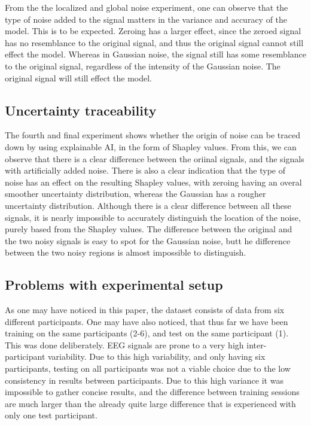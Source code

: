 From the the localized and global noise experiment, one can observe that the type of noise added to the signal matters in the variance and accuracy of the model. This is to be expected. Zeroing has a larger effect, since the zeroed signal has no resemblance to the original signal, and thus the original signal cannot still effect the model. Whereas in Gaussian noise, the signal still has some resemblance to the original signal, regardless of the intensity of the Gaussian noise. The original signal will still effect the model.  

\subsection{Uncertainty traceability}


The fourth and final experiment shows whether the origin of noise can be traced down by using explainable AI, in the form of Shapley values. From this, we can observe that there is a clear difference between the oriinal signals, and the signals with artificially added noise. There is also a clear indication that the type of noise has an effect on the resulting Shapley values, with zeroing having an overal smoother uncertainty distribution, whereas the Gaussian has a rougher uncertainty distribution. Although there is a clear difference between all these signals, it is nearly impossible to accurately distinguish the location of the noise, purely based from the Shapley values. The difference between the original and the two noisy signals is easy to spot for the Gaussian noise, butt he difference between the two noisy regions is almost impossible to distinguish.

\subsection{Problems with experimental setup}

As one may have noticed in this paper, the dataset consists of data from six different participants. One may have also noticed, that thus far we have been training on the same participants (2-6), and test on the same participant (1). This was done deliberately. EEG signals are prone to a very high inter-participant variability. Due to this high variability, and only having six participants, testing on all participants was not a viable choice due to the low consistency in results between participants. Due to this high variance it was impossible to gather concise results, and the difference between training sessions are much larger than the already quite large difference that is experienced with only one test participant.

